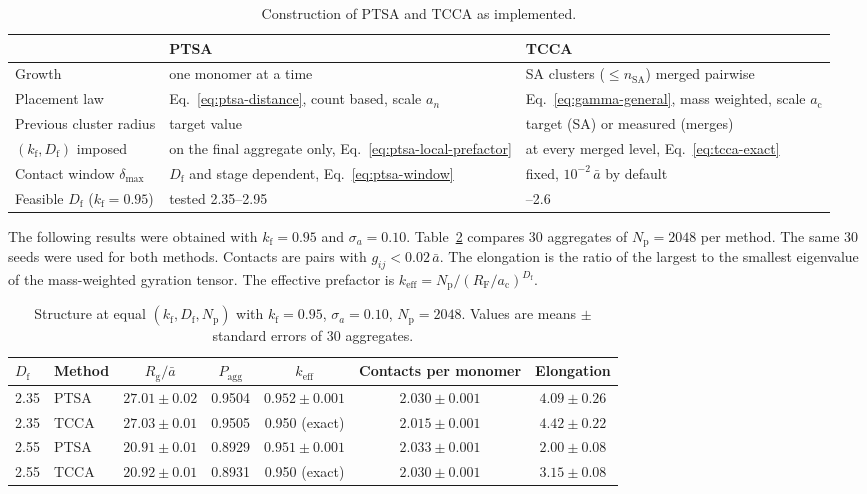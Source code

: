 \documentclass[11pt,a4paper]{article}
\newcommand{\abar}{\bar{a}}
\newcommand{\Df}{D_\text{f}}
\newcommand{\kf}{k_\text{f}}
\newcommand{\RF}{R_\text{F}}
\newcommand{\Rg}{R_\text{g}}
\newcommand{\dmax}{\delta_\text{max}}
\newcommand{\nSA}{n_\text{SA}}
\begin{document}
\begin{table}[htbp]
  \centering
  \caption{Construction of PTSA and TCCA as implemented.}
  \label{tab:differences}
  \small
  \begin{tabular}{>{\raggedright\arraybackslash}p{38mm}>{\raggedright\arraybackslash}p{52mm}>{\raggedright\arraybackslash}p{52mm}}
    \toprule
    & PTSA & TCCA \\
    \midrule
    Growth & one monomer at a time & SA clusters ($\le \nSA$) merged pairwise \\
    Placement law & Eq.~\eqref{eq:ptsa-distance}, count based, scale $a_n$ & Eq.~\eqref{eq:gamma-general}, mass weighted, scale $a_\text{c}$ \\
    Previous cluster radius & target value & target (SA) or measured (merges) \\
    $(\kf, \Df)$ imposed & on the final aggregate only, Eq.~\eqref{eq:ptsa-local-prefactor} & at every merged level, Eq.~\eqref{eq:tcca-exact} \\
    Contact window $\dmax$ & $\Df$ and stage dependent, Eq.~\eqref{eq:ptsa-window} & fixed, $10^{-2}\,\abar$ by default \\
    Feasible $\Df$ ($\kf = 0.95$) & tested 2.35--2.95 & 1.8--2.6 \\
    \bottomrule
  \end{tabular}
\end{table}

The following results were obtained with $\kf = 0.95$ and $\sigma_a = 0.10$.
Table~\ref{tab:structure} compares 30 aggregates of $N_\text{p} = 2048$ per method.
The same 30 seeds were used for both methods.
Contacts are pairs with $g_{ij} < 0.02\,\abar$.
The elongation is the ratio of the largest to the smallest eigenvalue of the mass-weighted gyration tensor.
The effective prefactor is $k_\text{eff} = N_\text{p} / (\RF/a_\text{c})^{\Df}$.

\begin{table}[htbp]
  \centering
  \caption{Structure at equal $(\kf, \Df, N_\text{p})$ with $\kf = 0.95$, $\sigma_a = 0.10$, $N_\text{p} = 2048$.
  Values are means $\pm$ standard errors of 30 aggregates.}
  \label{tab:structure}
  \small
  \begin{tabular}{llccccc}
    \toprule
    $\Df$ & Method & $\Rg/\abar$ & $P_\text{agg}$ & $k_\text{eff}$ & Contacts per monomer & Elongation \\
    \midrule
    2.35 & PTSA & $27.01 \pm 0.02$ & 0.9504 & $0.952 \pm 0.001$ & $2.030 \pm 0.001$ & $4.09 \pm 0.26$ \\
    2.35 & TCCA & $27.03 \pm 0.01$ & 0.9505 & 0.950 (exact)     & $2.015 \pm 0.001$ & $4.42 \pm 0.22$ \\
    2.55 & PTSA & $20.91 \pm 0.01$ & 0.8929 & $0.951 \pm 0.001$ & $2.033 \pm 0.001$ & $2.00 \pm 0.08$ \\
    2.55 & TCCA & $20.92 \pm 0.01$ & 0.8931 & 0.950 (exact)     & $2.030 \pm 0.001$ & $3.15 \pm 0.08$ \\
    \bottomrule
  \end{tabular}
\end{table}
\end{document}
